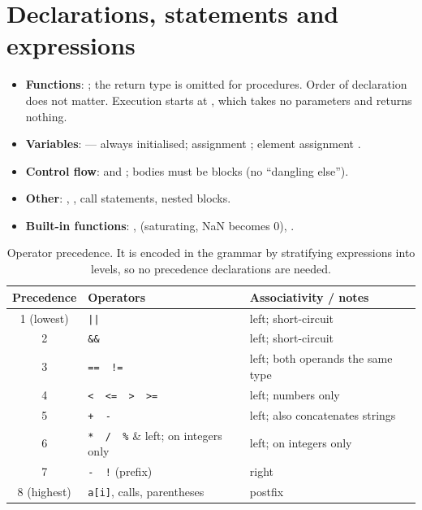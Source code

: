 \section{Declarations, statements and expressions}
\begin{itemize}
  \item \textbf{Functions}: ; the return type is omitted for procedures. Order of declaration does not matter. Execution starts at , which takes no parameters and returns nothing.
  \item \textbf{Variables}:  --- always initialised; assignment ; element assignment .
  \item \textbf{Control flow}:  and ; bodies must be blocks (no ``dangling else'').
  \item \textbf{Other}: , , call statements, nested blocks.
  \item \textbf{Built-in functions}: ,  (saturating, NaN becomes 0), .
\end{itemize}

\begin{table}[H]\centering\small
\begin{tabular}{@{}clp{}@{}}\toprule
\textbf{Precedence} & \textbf{Operators} & \textbf{Associativity / notes}\\ \midrule
1 (lowest) & \verb+||+ & left; short-circuit\\
2 & \verb+&&+ & left; short-circuit\\
3 & \verb+==  !=+ & left; both operands the same type\\
4 & \verb+<  <=  >  >=+ & left; numbers only\\
5 & \verb|+  -| & left; \code{+} also concatenates strings\\
6 & \verb|*  /  %| & left; \code{\%} on integers only\\
7 & \verb|-  !| (prefix) & right\\
8 (highest) & \verb|a[i]|, calls, parentheses & postfix\\ \bottomrule
\end{tabular}
\caption{Operator precedence. It is encoded in the grammar by stratifying expressions into levels, so no precedence declarations are needed.}
\end{table}

